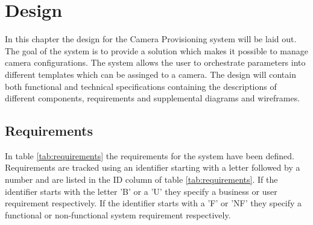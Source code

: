 \section{Design}
\label{sec:design}
In this chapter the design for the Camera Provisioning system will be laid out.
The goal of the system is to provide a solution which makes it possible to manage camera configurations.
The system allows the user to orchestrate parameters into different templates which can be assinged to a camera.
The design will contain both functional and technical specifications containing the descriptions of different components, requirements and supplemental diagrams and wireframes.
\subsection{Requirements}
In table \ref{tab:requirements} the requirements for the system have been defined. Requirements are tracked using an identifier starting with a letter followed by a
number and are listed in the ID column of table \ref{tab:requirements}. If the identifier starts with the letter 'B' or a 'U' they specify a business or user requirement respectively. If the identifier starts with a 'F' or 'NF' they specify a functional or non-functional system requirement respectively.
